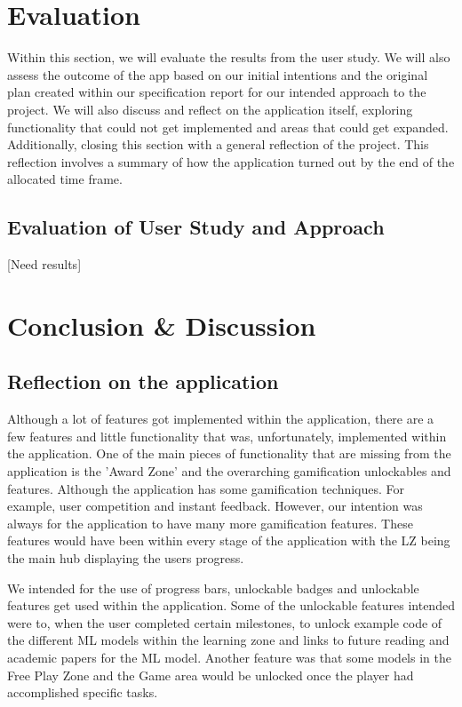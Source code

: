 \chapter{Evaluation}
	Within this section, we will evaluate the results from the user study. We will also assess the outcome of the app based on our initial intentions and the original plan created within our specification report for our intended approach to the project. We will also discuss and reflect on the application itself, exploring functionality that could not get implemented and areas that could get expanded. Additionally, closing this section with a general reflection of the project. This reflection involves a summary of how the application turned out by the end of the allocated time frame. 

	\section{Evaluation of User Study and Approach}
	[Need results]	


\chapter{Conclusion \& Discussion}
	\section{Reflection on the application}
		Although a lot of features got implemented within the application, there are a few features and little functionality that was, unfortunately, implemented within the application. One of the main pieces of functionality that are missing from the application is the 'Award Zone' and the overarching gamification unlockables and features. Although the application has some gamification techniques. For example, user competition and instant feedback. However, our intention was always for the application to have many more gamification features. These features would have been within every stage of the application with the LZ being the main hub displaying the users progress. 

		We intended for the use of progress bars, unlockable badges and unlockable features get used within the application. Some of the unlockable features intended were to, when the user completed certain milestones, to unlock example code of the different ML models within the learning zone and links to future reading and academic papers for the ML model. Another feature was that some models in the Free Play Zone and the Game area would be unlocked once the player had accomplished specific tasks.

